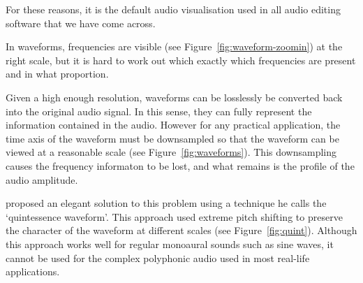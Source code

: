 For these reasons, it is the default audio visualisation used in all audio editing software that we have come across.


In waveforms, frequencies are visible (see Figure~\ref{fig:waveform-zoomin}) at the right scale, but it is hard to work
out which exactly which frequencies are present and in what proportion.

Given a high enough resolution, waveforms can be losslessly be converted back into the original audio signal. In this
sense, they can fully represent the information contained in the audio. However for any practical application, the
time axis of the waveform must be downsampled so that the waveform can be viewed at a reasonable scale (see
Figure~\ref{fig:waveforms}).  This downsampling causes the frequency informaton to be lost, and what remains is the
profile of the audio amplitude.

\citet{Loviscach2011}
proposed an elegant solution to this problem using a technique he calls the `quintessence waveform'. This approach
used extreme pitch shifting to preserve the character of the waveform at different scales (see Figure~\ref{fig:quint}).
Although this approach works well for regular monoaural sounds such as sine waves, it cannot be used for the complex
polyphonic audio used in most real-life applications.

